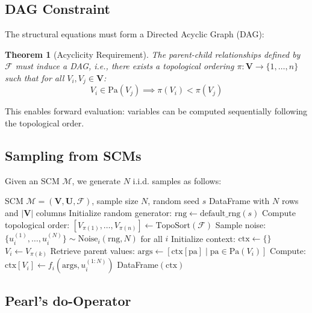 \documentclass[11pt,a4paper]{article}
\newtheorem{theorem}{Theorem}[section]
\begin{document}
\subsection{DAG Constraint}

The structural equations must form a Directed Acyclic Graph (DAG):

\begin{theorem}[Acyclicity Requirement]
The parent-child relationships defined by $\mathcal{F}$ must induce a DAG, i.e., there exists a topological ordering $\pi: \mathbf{V} \to \{1, \ldots, n\}$ such that for all $V_i, V_j \in \mathbf{V}$:
\[
V_i \in \text{Pa}(V_j) \implies \pi(V_i) < \pi(V_j)
\]
\end{theorem}

This enables forward evaluation: variables can be computed sequentially following the topological order.

\subsection{Sampling from SCMs}

Given an SCM $\mathcal{M}$, we generate $N$ i.i.d. samples as follows:

\begin{algorithm}
\caption{SCM Sampling Algorithm}
\begin{algorithmic}[1]
\Require SCM $\mathcal{M} = (\mathbf{V}, \mathbf{U}, \mathcal{F})$, sample size $N$, random seed $s$
\Ensure DataFrame with $N$ rows and $|\mathbf{V}|$ columns
\State Initialize random generator: $\text{rng} \gets \text{default\_rng}(s)$
\State Compute topological order: $[V_{\pi(1)}, \ldots, V_{\pi(n)}] \gets \text{TopoSort}(\mathcal{F})$
\State Sample noise: $\{u_i^{(1)}, \ldots, u_i^{(N)}\} \sim \text{Noise}_i(\text{rng}, N)$ for all $i$
\State Initialize context: $\text{ctx} \gets \{\}$
    \State $V_i \gets V_{\pi(k)}$
    \State Retrieve parent values: $\text{args} \gets [\text{ctx}[\text{pa}] \mid \text{pa} \in \text{Pa}(V_i)]$
    \State Compute: $\text{ctx}[V_i] \gets f_i(\text{args}, u_i^{(1:N)})$ 
\EndFor
\State \Return DataFrame$(\text{ctx})$
\end{algorithmic}
\end{algorithm}

\subsection{Pearl's do-Operator}
\end{document}
